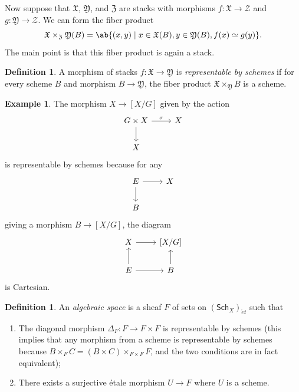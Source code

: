 \documentclass{amsart}
\theoremstyle{definition}
\newtheorem{defn}[thm]{Definition}
\newtheorem{exm}[thm]{Example}
\theoremstyle{remark}
\theoremstyle{plain}
\theoremstyle{definition}
\theoremstyle{remark}
\newcommand{\mc}[1]{\mathcal{#1}}
\newcommand{\mf}[1]{\mathfrak{#1}}
\newcommand{\ms}[1]{\mathsf{#1}}
\newcommand{\1}{\mathbf{1}}
\newcommand{\2}{\mathbf{2}}
\newcommand{\3}{\mathbf{3}}
\begin{document}
Now suppose that \(\mf{X}\), \(\mf{Y}\), and \(\mf{Z}\) are stacks with morphisms \(f \colon \mf{X} \to \mc{Z}\) and \(g \colon \mf{Y} \to \mc{Z}\). We can form the fiber product
\[ \mf{X} \times_{\mf{Z}} \mf{Y} (B) = \ab\{ (x, y) \mid x \in \mf{X}(B), y \in \mf{Y}(B), f(x) \simeq g(y) \}. \]
The main point is that this fiber product is again a stack.

\begin{defn}
    A morphism of stacks \(f \colon \mf{X} \to \mf{Y}\) is \textit{representable by schemes} if for every scheme \(B\) and morphism \(B \to \mf{Y}\), the fiber product \(\mf{X} \times_{\mf{Y}} B\) is a scheme.
\end{defn}

\begin{exm}
    The morphism \(X \to [X/G]\) given by the action
    \begin{equation*}
    \begin{tikzcd}
        G \times X \ar{d} \ar{r}{\sigma} & X \\
        X
    \end{tikzcd}
    \end{equation*}
    is representable by schemes because for any
    \begin{equation*}
    \begin{tikzcd}
        E \ar{r} \ar{d} & X \\
        B
    \end{tikzcd}
    \end{equation*}
    giving a morphism \(B \to [X/G]\), the diagram
    \begin{equation*}
    \begin{tikzcd}
        X \ar{r} & {[X/G]} \\
        E \ar{u} \ar{r} & B \ar{u}
    \end{tikzcd}
    \end{equation*}
    is Cartesian.
\end{exm}

\begin{defn}
    An \textit{algebraic space} is a sheaf \(F\) of sets on \((\ms{Sch}_X)_{\acute{e}t}\) such that
    \begin{enumerate}
        \item The diagonal morphism \(\Delta_F \colon F \to F \times F\) is representable by schemes (this implies that any morphism from a scheme is representable by schemes because \(B \times_F C = (B \times C) \times_{F \times F} F\), and the two conditions are in fact equivalent);
        \item There exists a surjective \'etale morphism \(U \to F\) where \(U\) is a scheme.
    \end{enumerate}
\end{defn}
\end{document}
